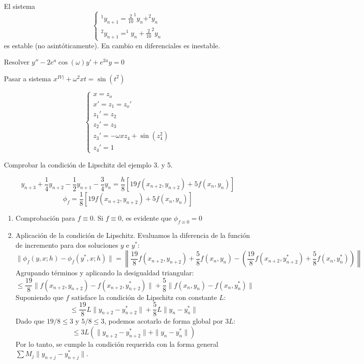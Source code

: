 \begin{obs}
    El sistema 
    $$\begin{cases}
        ^1y_{n+1} = \frac{2}{10} ^1y_n + ^2y_n \\ ^2y_{n+1} = ^1y_n +\frac{2}{10} ^2y_n
    \end{cases}$$
    es estable (no asint\'oticamente). En cambio en diferenciales es inestable.
\end{obs}
\begin{ejer}[1.5]
    Resolver $y'' - 2e^a \cos (\omega) y' + e^{2a} y=0$
\end{ejer}
\begin{ejer}
    [3.b] Pasar a sistema $x^{IV)} + \omega^2xt = \sin(t^2)$
\end{ejer}
\begin{sol}
    $$\begin{cases}
        x=z_o \\ x' = z_1=z_o' \\ z_1'=z_2 \\ z_2' = z_3 \\ z_3' = -\omega x z_4 + \sin(z_4^2) \\ z_4' = 1
    \end{cases}$$
\end{sol}
\begin{ejer}
    Comprobar la condici\'on de Lipschitz del ejemplo 3. y 5. 
\end{ejer}
\begin{sol}[3]
    $$y_{n+3} + \frac{1}{4}y_{n+2} - \frac{1}{2}y_{n+1} - \frac{3}{4}y_n = \frac{h}{8} \left[ 19 f(x_{n+2}, y_{n+2}) + 5 f(x_n, y_n) \right]$$$$
\phi_f = \frac{1}{8} \left[ 19 f(x_{n+2}, y_{n+2}) + 5 f(x_n, y_n) \right]
$$

\begin{enumerate}
    \item Comprobación para $f \equiv 0$. Si $f \equiv 0$, es evidente que $\phi_{f \equiv 0} = 0$
    \item Aplicación de la condición de Lipschitz. Evaluamos la diferencia de la función de incremento para dos soluciones $y$ e $y^*$:
    $$
    \|\phi_f(y, x; h) - \phi_f(y^*, x; h)\| = \left\| \frac{19}{8} f(x_{n+2}, y_{n+2}) + \frac{5}{8} f(x_n, y_n) - \left( \frac{19}{8} f(x_{n+2}, y^*_{n+2}) + \frac{5}{8} f(x_n, y^*_n) \right) \right\|
    $$
    Agrupando términos y aplicando la desigualdad triangular:
    $$
    \le \frac{19}{8} \|f(x_{n+2}, y_{n+2}) - f(x_{n+2}, y^*_{n+2})\| + \frac{5}{8} \|f(x_n, y_n) - f(x_n, y^*_n)\|
    $$
    Suponiendo que $f$ satisface la condición de Lipschitz con constante $L$:
    $$
    \le \frac{19}{8} L \|y_{n+2} - y^*_{n+2}\| + \frac{5}{8} L \|y_n - y^*_n\|
    $$
    Dado que $19/8 \le 3$ y $5/8 \le 3$, podemos acotarlo de forma global por $3L$:
    $$
    \le 3L \left( \|y_{n+2} - y^*_{n+2}\| + \|y_n - y^*_n\| \right)
    $$
    Por lo tanto, se cumple la condición requerida con la forma general $\sum M_j \|y_{n+j} - y^*_{n+j}\|$.
\end{enumerate}
\end{sol}
